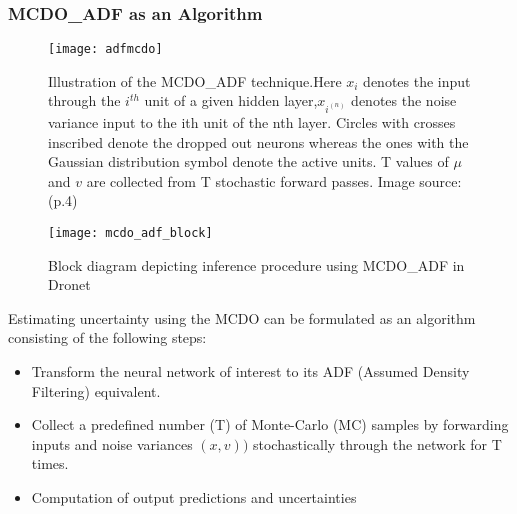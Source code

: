 	\subsubsection{MCDO\_ADF as an Algorithm}
		\begin{figure}[H]
		\texttt{[image: adfmcdo]}
		\caption[Illustration of the MCDO\_ADF technique]{Illustration of the MCDO\_ADF technique.Here $x_{i}$ denotes the input through the $i^{th}$ unit of a given hidden layer,$x_{i^{(n)}}$ denotes the noise variance input to the ith unit of the nth layer. Circles with crosses inscribed denote the dropped out neurons whereas the ones with the Gaussian distribution symbol denote the active units. T values of $\mu$ and $v$ are collected from T stochastic forward passes. Image source: \cite{loquercio2020a} (p.4)}
		\label{fig_adf_mcdo}
	\end{figure}
	\begin{figure}[H]
		\texttt{[image: mcdo\_adf\_block]}
		\caption{Block diagram depicting inference procedure using MCDO\_ADF in Dronet}
		\label{fig_mcdo_adf_block}
	\end{figure}
	Estimating uncertainty using the MCDO can be formulated as an algorithm consisting of the following steps:
	\begin{itemize}
		\item Transform the neural network of interest to its ADF (Assumed Density Filtering) equivalent.
		\item Collect a predefined number (T) of Monte-Carlo (MC) samples by forwarding inputs and noise variances $(x,v))$ stochastically through the network for T times.
		\item Computation of output predictions and uncertainties  
	\end{itemize}


